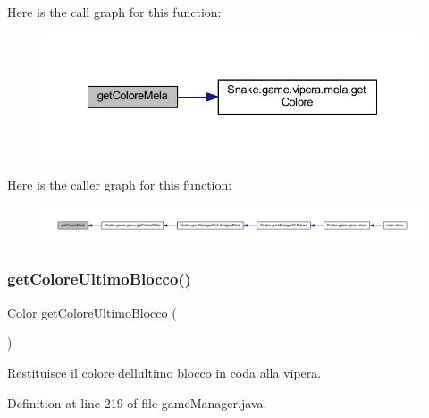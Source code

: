 Here is the call graph for this function\+:
\nopagebreak
\begin{figure}[H]
\begin{center}
\leavevmode
\includegraphics[width=335pt]{class_snake_1_1game_1_1utility_1_1game_manager_a15fad4646c986312b476543b2f7e547a_cgraph}
\end{center}
\end{figure}
Here is the caller graph for this function\+:
\nopagebreak
\begin{figure}[H]
\begin{center}
\leavevmode
\includegraphics[width=350pt]{class_snake_1_1game_1_1utility_1_1game_manager_a15fad4646c986312b476543b2f7e547a_icgraph}
\end{center}
\end{figure}
\mbox{\label{class_snake_1_1game_1_1utility_1_1game_manager_a1afbc9b85396f53e6180eab2e5a36d4d}} 
\subsubsection{\texorpdfstring{get\+Colore\+Ultimo\+Blocco()}{getColoreUltimoBlocco()}}
{\footnotesize\ttfamily Color get\+Colore\+Ultimo\+Blocco (\begin{DoxyParamCaption}{ }\end{DoxyParamCaption})}



Restituisce il colore dell\textquotesingle{}ultimo blocco in coda alla vipera. 



Definition at line 219 of file game\+Manager.\+java.

